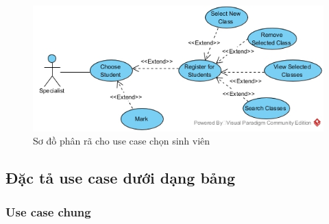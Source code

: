 \documentclass[12pt]{article}
\begin{document}
  \FloatBarrier
  \begin{figure}[ht]
    \centering
    \includegraphics[scale=0.5]{../pictures/projectdiagrams/Choose-Student-uc-destructing.jpg}
    \caption{Sơ đồ phân rã cho use case chọn sinh viên}
  \end{figure}
  \FloatBarrier

  \newpage
  \subsection{Đặc tả use case dưới dạng bảng}

  \subsubsection{Use case chung}
\end{document}
